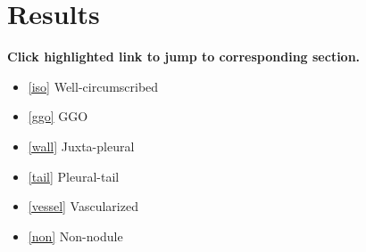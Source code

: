 \documentclass[onecolumn]{IEEEtran}
\begin{document}
\section{Results}
\textbf{Click highlighted link to jump to corresponding section.}
\begin{itemize}
\item \ref{iso} Well-circumscribed
\item \ref{ggo} GGO
\item \ref{wall} Juxta-pleural
\item \ref{tail} Pleural-tail
\item \ref{vessel} Vascularized
\item \ref{non} Non-nodule
\end{itemize}

\newpage
\end{document}
